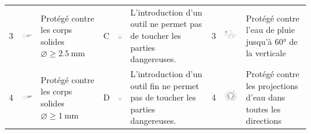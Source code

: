 \begin{xltabular}{\linewidth}{p{0.3cm} m{2cm} X p{0.3cm} m{2cm} X p{0.3cm} m{2.2cm} X}
3 		& 	\includegraphics[scale=1.1]{3X.png} & Protégé contre les corps solides $\diameter \geq \SI{2,5}{\milli\meter}$  	& C	& \includegraphics[width=2cm]{C.png}	&	L'introduction d'un outil ne permet pas de toucher les parties dangereuses. & 3 & 	\includegraphics[scale=1.1]{X3.png}	&	Protégé contre l'eau de pluie jusqu'à 60° de la verticale \\
4 		& 	\includegraphics[scale=1.1]{4X.png} & Protégé contre les corps solides $\diameter \geq \SI{1}{\milli\meter}$  	& D	& \includegraphics[width=2cm]{D.png}	&	L'introduction d'un outil fin ne permet pas de toucher les parties dangereuses. & 4 & 	\includegraphics[scale=1.1]{X4.png}	&	Protégé contre les projections d'eau dans toutes les directions \\

\end{xltabular}

